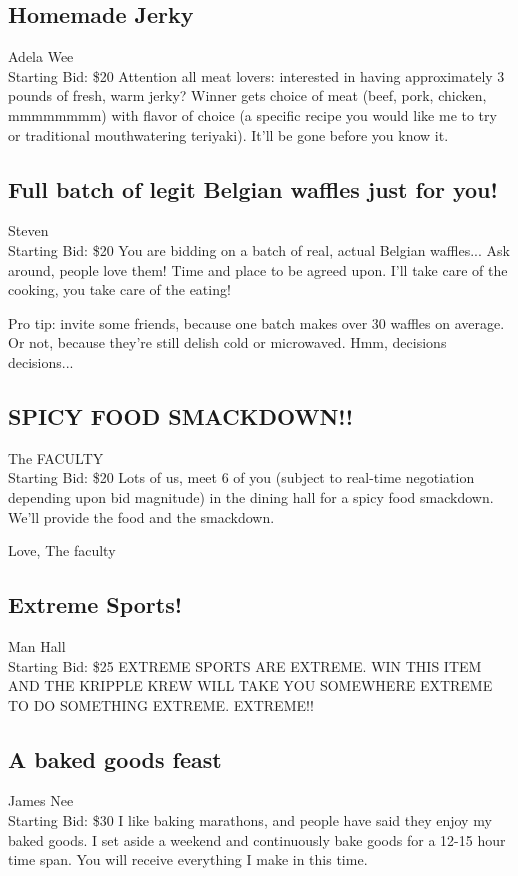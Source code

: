 \documentclass[11pt]{article}
\begin{document}
\subsection{Homemade Jerky}
Adela Wee
\\
Starting Bid: \$20
\newline
Attention all meat lovers: interested in having approximately 3 pounds of fresh, warm jerky?  Winner gets choice of meat (beef, pork, chicken, mmmmmmmm) with flavor of choice (a specific recipe you would like me to try or traditional mouthwatering teriyaki).  It'll be gone before you know it.
\subsection{Full batch of legit Belgian waffles just for you!}
Steven
\\
Starting Bid: \$20
\newline
You are bidding on a batch of real, actual Belgian waffles... Ask around, people love them! Time and place to be agreed upon. I'll take care of the cooking, you take care of the eating!

Pro tip: invite some friends, because one batch makes over 30 waffles on average. Or not, because they're still delish cold or microwaved. Hmm, decisions decisions...
\subsection{SPICY FOOD SMACKDOWN!!}
The FACULTY
\\
Starting Bid: \$20
\newline
Lots of us, meet 6 of you (subject to real-time negotiation depending upon bid magnitude) in the dining hall for a spicy food smackdown. We'll provide the food and the smackdown.

Love,
The faculty
\subsection{Extreme Sports!}
Man Hall
\\
Starting Bid: \$25
\newline
EXTREME SPORTS ARE EXTREME. WIN THIS ITEM AND THE KRIPPLE KREW WILL TAKE YOU SOMEWHERE EXTREME TO DO SOMETHING EXTREME. EXTREME!!
\subsection{A baked goods feast}
James Nee
\\
Starting Bid: \$30
\newline
I like baking marathons, and people have said they enjoy my baked goods. I set aside a weekend and continuously bake goods for a 12-15 hour time span. You will receive everything I make in this time.
\end{document}
